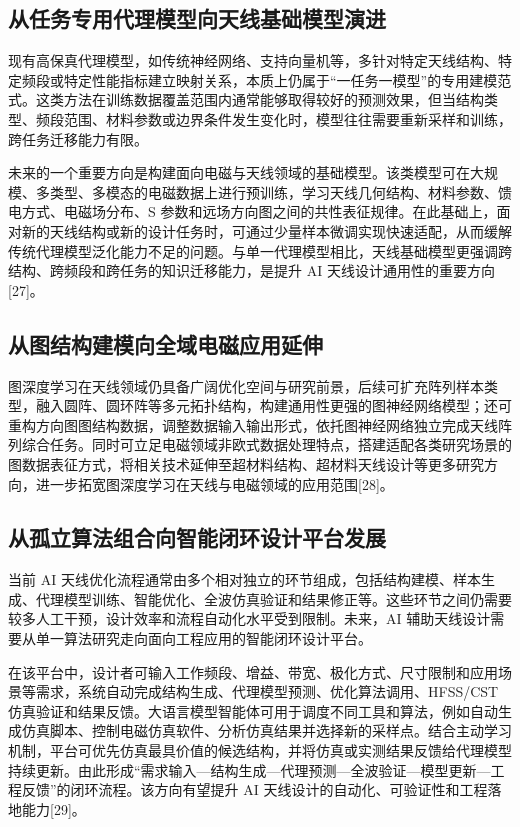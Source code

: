 \documentclass[UTF8,a4paper,12pt]{ctexart}
\begin{document}
\subsection{从任务专用代理模型向天线基础模型演进}

现有高保真代理模型，如传统神经网络、支持向量机等，多针对特定天线结构、特定频段或特定性能指标建立映射关系，本质上仍属于“一任务一模型”的专用建模范式。这类方法在训练数据覆盖范围内通常能够取得较好的预测效果，但当结构类型、频段范围、材料参数或边界条件发生变化时，模型往往需要重新采样和训练，跨任务迁移能力有限。

未来的一个重要方向是构建面向电磁与天线领域的基础模型。该类模型可在大规模、多类型、多模态的电磁数据上进行预训练，学习天线几何结构、材料参数、馈电方式、电磁场分布、S 参数和远场方向图之间的共性表征规律。在此基础上，面对新的天线结构或新的设计任务时，可通过少量样本微调实现快速适配，从而缓解传统代理模型泛化能力不足的问题。与单一代理模型相比，天线基础模型更强调跨结构、跨频段和跨任务的知识迁移能力，是提升 AI 天线设计通用性的重要方向[27]。

\subsection{从图结构建模向全域电磁应用延伸}

图深度学习在天线领域仍具备广阔优化空间与研究前景，后续可扩充阵列样本类型，融入圆阵、圆环阵等多元拓扑结构，构建通用性更强的图神经网络模型；还可重构方向图图结构数据，调整数据输入输出形式，依托图神经网络独立完成天线阵列综合任务。同时可立足电磁领域非欧式数据处理特点，搭建适配各类研究场景的图数据表征方式，将相关技术延伸至超材料结构、超材料天线设计等更多研究方向，进一步拓宽图深度学习在天线与电磁领域的应用范围[28]。

\subsection{从孤立算法组合向智能闭环设计平台发展}

当前 AI 天线优化流程通常由多个相对独立的环节组成，包括结构建模、样本生成、代理模型训练、智能优化、全波仿真验证和结果修正等。这些环节之间仍需要较多人工干预，设计效率和流程自动化水平受到限制。未来，AI 辅助天线设计需要从单一算法研究走向面向工程应用的智能闭环设计平台。

在该平台中，设计者可输入工作频段、增益、带宽、极化方式、尺寸限制和应用场景等需求，系统自动完成结构生成、代理模型预测、优化算法调用、HFSS/CST 仿真验证和结果反馈。大语言模型智能体可用于调度不同工具和算法，例如自动生成仿真脚本、控制电磁仿真软件、分析仿真结果并选择新的采样点。结合主动学习机制，平台可优先仿真最具价值的候选结构，并将仿真或实测结果反馈给代理模型持续更新。由此形成“需求输入—结构生成—代理预测—全波验证—模型更新—工程反馈”的闭环流程。该方向有望提升 AI 天线设计的自动化、可验证性和工程落地能力[29]。
\end{document}
